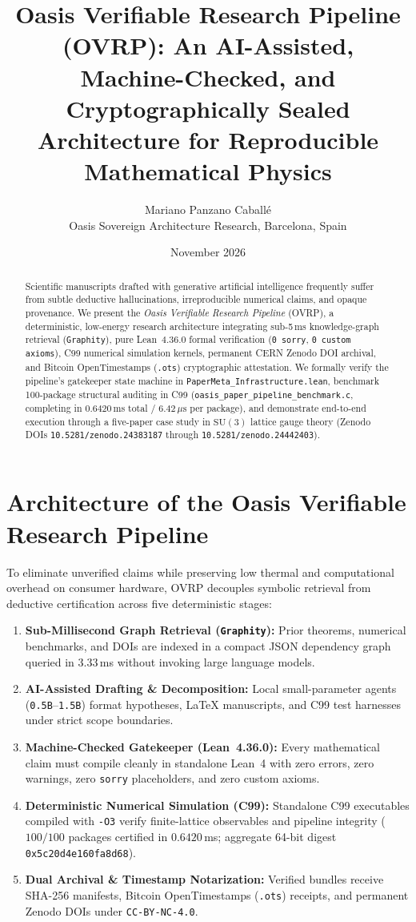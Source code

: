 \documentclass[11pt,a4paper]{article}
\title{Oasis Verifiable Research Pipeline (OVRP): An AI-Assisted, Machine-Checked, and Cryptographically Sealed Architecture for Reproducible Mathematical Physics}
\author{Mariano Panzano Caball\'e \\ \small Oasis Sovereign Architecture Research, Barcelona, Spain}
\date{November 2026}
\begin{document}
\maketitle

\begin{abstract}
Scientific manuscripts drafted with generative artificial intelligence frequently suffer from subtle deductive hallucinations, irreproducible numerical claims, and opaque provenance. We present the \emph{Oasis Verifiable Research Pipeline} (OVRP), a deterministic, low-energy research architecture integrating sub-5\,ms knowledge-graph retrieval (\texttt{Graphity}), pure Lean~4.36.0 formal verification (\texttt{0 sorry}, \texttt{0 custom axioms}), C99 numerical simulation kernels, permanent CERN Zenodo DOI archival, and Bitcoin OpenTimestamps (\texttt{.ots}) cryptographic attestation. We formally verify the pipeline's gatekeeper state machine in \texttt{PaperMeta\_Infrastructure.lean}, benchmark 100-package structural auditing in C99 (\texttt{oasis\_paper\_pipeline\_benchmark.c}, completing in $0.6420$\,ms total / $6.42\,\mu\mathrm{s}$ per package), and demonstrate end-to-end execution through a five-paper case study in $\mathrm{SU}(3)$ lattice gauge theory (Zenodo DOIs \texttt{10.5281/zenodo.24383187} through \texttt{10.5281/zenodo.24442403}).
\end{abstract}

\section{Architecture of the Oasis Verifiable Research Pipeline}
To eliminate unverified claims while preserving low thermal and computational overhead on consumer hardware, OVRP decouples symbolic retrieval from deductive certification across five deterministic stages:
\begin{enumerate}
  \item \textbf{Sub-Millisecond Graph Retrieval (\texttt{Graphity}):} Prior theorems, numerical benchmarks, and DOIs are indexed in a compact JSON dependency graph queried in $3.33$\,ms without invoking large language models.
  \item \textbf{AI-Assisted Drafting \& Decomposition:} Local small-parameter agents (\texttt{0.5B}--\texttt{1.5B}) format hypotheses, LaTeX manuscripts, and C99 test harnesses under strict scope boundaries.
  \item \textbf{Machine-Checked Gatekeeper (Lean~4.36.0):} Every mathematical claim must compile cleanly in standalone Lean~4 with zero errors, zero warnings, zero \texttt{sorry} placeholders, and zero custom axioms.
  \item \textbf{Deterministic Numerical Simulation (C99):} Standalone C99 executables compiled with \texttt{-O3} verify finite-lattice observables and pipeline integrity ($100/100$ packages certified in $0.6420$\,ms; aggregate 64-bit digest \texttt{0x5c20d4e160fa8d68}).
  \item \textbf{Dual Archival \& Timestamp Notarization:} Verified bundles receive SHA-256 manifests, Bitcoin OpenTimestamps (\texttt{.ots}) receipts, and permanent Zenodo DOIs under \texttt{CC-BY-NC-4.0}.
\end{enumerate}
\end{document}
